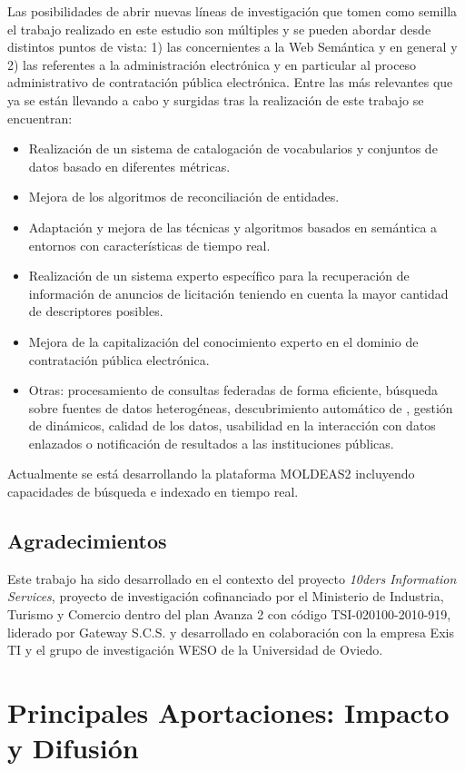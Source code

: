 \documentclass[a4paper,final,11pt,fleqn,twoside]{book}  %
\begin{document}
Las posibilidades de abrir nuevas líneas de investigación que tomen como semilla el trabajo realizado en este estudio son múltiples 
y se pueden abordar desde distintos puntos de vista: 1) las concernientes a la Web Semántica y \linkeddata en general y 
2) las referentes a la administración electrónica y en particular al proceso administrativo de contratación pública electrónica. Entre 
las más relevantes que ya se están llevando a cabo y surgidas tras la realización de este trabajo se encuentran:
\begin{itemize}
 \item Realización de un sistema de catalogación de vocabularios y conjuntos de datos basado en diferentes métricas.
 \item Mejora de los algoritmos de reconciliación de entidades.
 \item Adaptación y mejora de las técnicas y algoritmos basados en semántica a entornos con características de tiempo real.
 \item Realización de un sistema experto específico para la recuperación de información de anuncios de licitación teniendo en cuenta la mayor cantidad de descriptores posibles.
 \item Mejora de la capitalización del conocimiento experto en el dominio de contratación pública electrónica.
 \item Otras: procesamiento de consultas federadas de forma eficiente, búsqueda sobre fuentes de datos heterogéneas, 
 descubrimiento automático de \datasets, gestión de \datasets dinámicos, calidad de los datos, usabilidad en la interacción con datos enlazados o 
 notificación de resultados a las instituciones públicas.
\end{itemize}

Actualmente se está desarrollando la plataforma MOLDEAS2 incluyendo capacidades de búsqueda e indexado en tiempo real.

\section*{Agradecimientos}
Este trabajo ha sido desarrollado en el contexto del proyecto \textit{10ders Information Services}, proyecto de investigación
cofinanciado por el Ministerio de Industria, Turismo y Comercio dentro del plan Avanza 2 con código TSI-020100-2010-919, 
liderado por Gateway S.C.S. y desarrollado en colaboración con la empresa Exis TI y el grupo de investigación WESO de la Universidad de Oviedo. 


\chapter{Principales Aportaciones: Impacto y Difusión}
\end{document}
